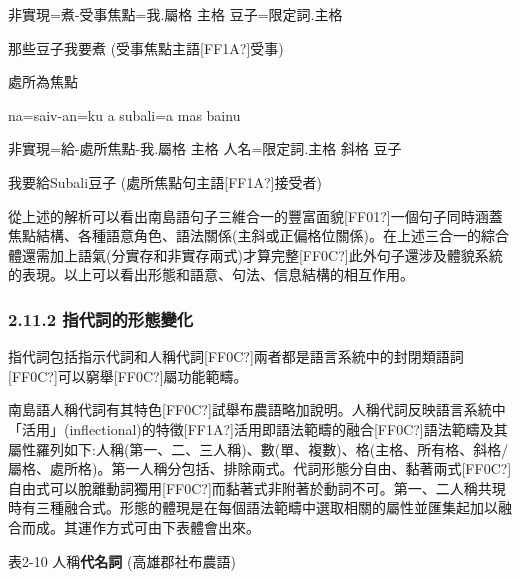  \textrm{非實現=煮-受事焦點=我.屬格  主格  豆子=限定詞.主格}

 \textrm{那些豆子我要煮 (受事焦點主語[FF1A?]受事)}

\rmfamily
處所為焦點

\begin{listWWviiiNumviiileveli}
\item \begin{styleqwerty}\rmfamily
na=saiv-an=ku  a  subali=a  mas  bainu
\end{styleqwerty}
\end{listWWviiiNumviiileveli}

 \textrm{非實現=給-處所焦點{}-我.屬格  主格  人名=限定詞.主格  斜格  豆子}

 \textrm{我要給Subali豆子 (處所焦點句主語[FF1A?]接受者)}

\textrm{從上述的解析可以看出南島語句子三維合一的豐富面貌[FF01?]一個句子同時涵蓋焦點結構、各種語意角色、語法關係(主斜或正偏格位關係)}。\textrm{在上述三合一的綜合體還需加上語氣(分實存和非實存兩式)才算完整[FF0C?]此外句子還涉及體貌系統的表現。以上可以看出形態和語意、句法、信息結構的相互作用。}

\subsubsection{\textrm{2.11.2 指代詞的形態變化}}

\textrm{指代詞包括指示代詞和人稱代詞[FF0C?]兩者都是語言系統中的封閉類語詞[FF0C?]可以窮舉[FF0C?]屬功能範疇。}

\textrm{南島語人稱代詞有其特色[FF0C?]試舉布農語略加說明。人稱代詞反映語言系統中「活用」(inflectional)的特徵[FF1A?]活用即語法範疇的融合[FF0C?]語法範疇及其屬性羅列如下:人稱(第一、二、三人稱)、數(單、複數)}、\textrm{格(主格、所有格、斜格/屬格、處所格)}。\textrm{第一人稱分包括、排除兩式。代詞形態分自由、黏著兩式[FF0C?]自由式可以脫離動詞獨用[FF0C?]而黏著式非附著於動詞不可。第一、二人稱共現時有三種融合式。形態的體現是在每個語法範疇中選取相關的屬性並匯集起加以融合而成。其運作方式可由下表體會出來。}

\textrm{表2-10 人稱}\textrm{\textbf{代名詞} (}高雄郡社布農語)

\tablefirsthead{}

